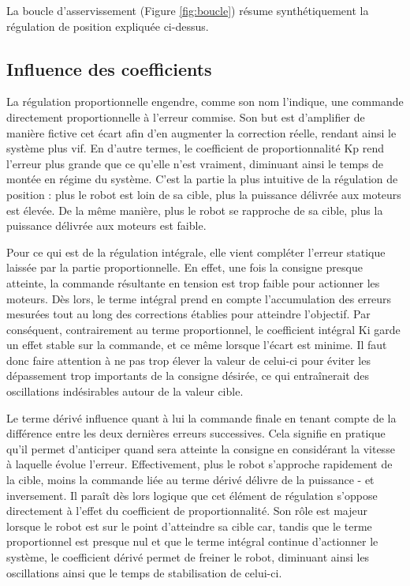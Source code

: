 \documentclass[a4paper,11pt]{article}
\begin{document}
La boucle d'asservissement (Figure \ref{fig:boucle}) résume synthétiquement la régulation de position expliquée ci-dessus.\\

\subsection{\label{subsec:influence}Influence des coefficients\cite{le_lann_pid_2007}}

La régulation proportionnelle engendre, comme son nom l'indique, une commande directement proportionnelle à l'erreur commise. Son but est d'amplifier de manière fictive cet écart afin d'en augmenter la correction réelle, rendant ainsi le système plus vif. En d'autre termes, le coefficient de proportionnalité Kp rend l'erreur plus grande que ce qu'elle n'est vraiment, diminuant ainsi le temps de montée en régime du système. C'est la partie la plus intuitive de la régulation de position : plus le robot est loin de sa cible, plus la puissance délivrée aux moteurs est élevée. De la même manière, plus le robot se rapproche de sa cible, plus la puissance délivrée aux moteurs est faible.

Pour ce qui est de la régulation intégrale, elle vient compléter l'erreur statique laissée par la partie proportionnelle. En effet, une fois la consigne presque atteinte, la commande résultante en tension est trop faible pour actionner les moteurs. Dès lors, le terme intégral prend en compte l'accumulation des erreurs mesurées tout au long des corrections établies pour atteindre l'objectif. Par conséquent, contrairement au terme proportionnel, le coefficient intégral Ki garde un effet stable sur la commande, et ce même lorsque l'écart est minime. Il faut donc faire attention à ne pas trop élever la valeur de celui-ci pour éviter les dépassement trop importants de la consigne désirée, ce qui entraînerait des oscillations indésirables autour de la valeur cible.

Le terme dérivé influence quant à lui la commande finale en tenant compte de la différence entre les deux dernières erreurs successives. Cela signifie en pratique qu'il permet d'anticiper quand sera atteinte la consigne en considérant la vitesse à laquelle évolue l'erreur. Effectivement, plus le robot s'approche rapidement de la cible, moins la commande liée au terme dérivé délivre de la puissance - et inversement. Il paraît dès lors logique que cet élément de régulation s'oppose directement à l'effet du coefficient de proportionnalité. Son rôle est majeur lorsque le robot est sur le point d'atteindre sa cible car, tandis que le terme proportionnel est presque nul et que le terme intégral continue d'actionner le système, le coefficient dérivé permet de freiner le robot, diminuant ainsi les oscillations ainsi que le temps de stabilisation de celui-ci.\\
\end{document}

